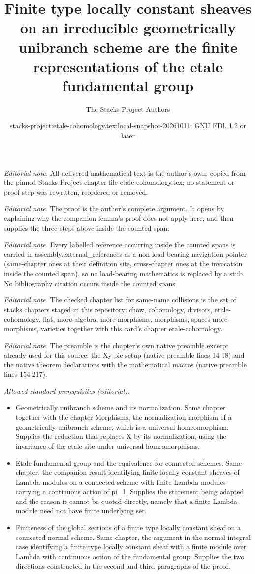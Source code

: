 \documentclass[10pt,a4paper]{amsart}
\title{Finite type locally constant sheaves on an irreducible geometrically unibranch scheme are the finite representations of the etale fundamental group}
\author{The Stacks Project Authors}
\date{stacks-project:etale-cohomology.tex:local-snapshot-20261011; GNU FDL 1.2 or later}
\theoremstyle{plain}
\theoremstyle{definition}
\theoremstyle{remark}
\numberwithin{equation}{subsection}
\begin{document}
\maketitle
\noindent\textit{Editorial note.} All delivered mathematical text is the author's own, copied from the pinned Stacks Project chapter file etale-cohomology.tex; no statement or proof step was rewritten, reordered or removed.\par\medskip
\noindent\textit{Editorial note.} The proof is the author's complete argument. It opens by explaining why the companion lemma's proof does not apply here, and then supplies the three steps above inside the counted span.\par\medskip
\noindent\textit{Editorial note.} Every labelled reference occurring inside the counted spans is carried in assembly.external\_references as a non-load-bearing navigation pointer (same-chapter ones at their definition site, cross-chapter ones at the invocation inside the counted span), so no load-bearing mathematics is replaced by a stub. No bibliography citation occurs inside the counted spans.\par\medskip
\noindent\textit{Editorial note.} The checked chapter list for same-name collisions is the set of stacks chapters staged in this repository: chow, cohomology, divisors, etale-cohomology, flat, more-algebra, more-morphisms, morphisms, spaces-more-morphisms, varieties together with this card's chapter etale-cohomology.\par\medskip
\noindent\textit{Editorial note.} The preamble is the chapter's own native preamble excerpt already used for this source: the Xy-pic setup (native preamble lines 14-18) and the native theorem declarations with the mathematical macros (native preamble lines 154-217).\par\medskip
\noindent\textit{Allowed standard prerequisites (editorial).}\begin{itemize}
\item Geometrically unibranch scheme and its normalization. Same chapter together with the chapter Morphisms, the normalization morphism of a geometrically unibranch scheme, which is a universal homeomorphism. Supplies the reduction that replaces X by its normalization, using the invariance of the etale site under universal homeomorphisms.
\item Etale fundamental group and the equivalence for connected schemes. Same chapter, the companion result identifying finite locally constant sheaves of Lambda-modules on a connected scheme with finite Lambda-modules carrying a continuous action of pi\_1. Supplies the statement being adapted and the reason it cannot be quoted directly, namely that a finite Lambda-module need not have finite underlying set.
\item Finiteness of the global sections of a finite type locally constant sheaf on a connected normal scheme. Same chapter, the argument in the normal integral case identifying a finite type locally constant sheaf with a finite module over Lambda with continuous action of the fundamental group. Supplies the two directions constructed in the second and third paragraphs of the proof.
\end{itemize}\medskip
\end{document}
